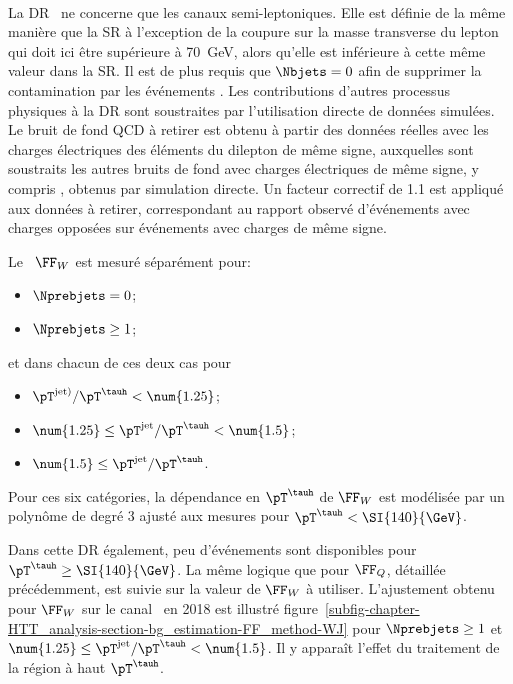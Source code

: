 \paragraph{\Wjets}
La DR \Wjets\ ne concerne que les canaux semi-leptoniques.
Elle est définie de la même manière que la SR à l'exception de la coupure sur la masse transverse du lepton qui doit ici être supérieure à \SI{70}{\GeV}, alors qu'elle est inférieure à cette même valeur dans la SR.
Il est de plus requis que $\Nbjets=0$ afin de supprimer la contamination par les événements \ttbar.
Les contributions d'autres processus physiques à la DR sont soustraites par l'utilisation directe de données simulées.
Le bruit de fond QCD à retirer est obtenu à partir des données réelles avec les charges électriques des éléments du dilepton de même signe, auxquelles sont soustraits les autres bruits de fond avec charges électriques de même signe, y compris \Wjets, obtenus par simulation directe.
Un facteur correctif de \num{1.1} est appliqué aux données à retirer, correspondant au rapport observé d'événements avec charges opposées sur événements avec charges de même signe.
\par
Le \fakefactor\ $\FF_W$ est mesuré séparément pour:
\begin{itemize}
\item $\Nprebjets=0$;
\item $\Nprebjets\geq1$;
\end{itemize}
et dans chacun de ces deux cas pour
\begin{itemize}
\item $\pT^{\text{jet})}/\pT^{\tauh} < \num{1.25}$;
\item $\num{1.25} \leq \pT^\text{jet}/\pT^{\tauh} < \num{1.5}$;
\item $\num{1.5} \leq \pT^\text{jet}/\pT^{\tauh}$.
\end{itemize}
Pour ces six catégories, la dépendance en $\pT^{\tauh}$ de $\FF_W$ est modélisée par un polynôme de degré 3 ajusté aux mesures pour $\pT^{\tauh}<\SI{140}{\GeV}$.
\par
Dans cette DR également, peu d'événements sont disponibles pour $\pT^{\tauh}\geq\SI{140}{\GeV}$.
La même logique que pour $\FF_Q$, détaillée précédemment, est suivie sur la valeur de $\FF_W$ à utiliser.
L'ajustement obtenu pour $\FF_W$ sur le canal \mu\tauh\ en 2018 est illustré figure~\ref{subfig-chapter-HTT_analysis-section-bg_estimation-FF_method-WJ} pour $\Nprebjets\geq1$ et $\num{1.25} \leq \pT^\text{jet}/\pT^{\tauh} < \num{1.5}$.
Il y apparaît l'effet du traitement de la région à haut $\pT^{\tauh}$.
